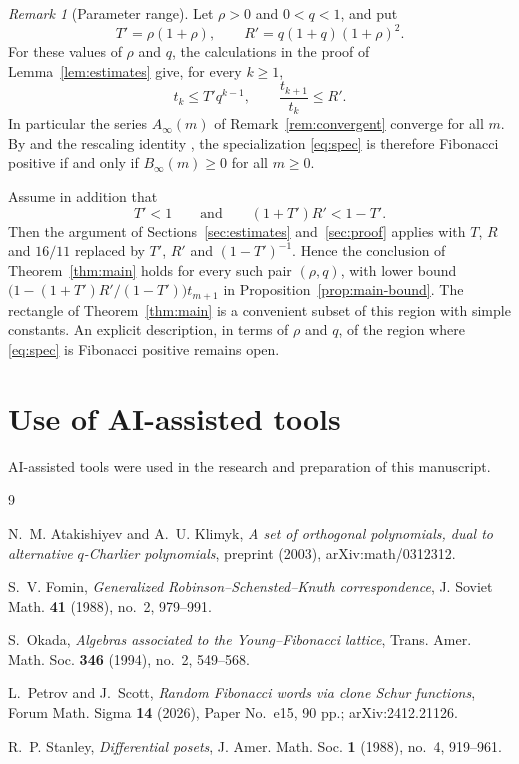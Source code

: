 \documentclass[11pt]{amsart}
\theoremstyle{definition}
\theoremstyle{remark}
\newtheorem{remark}[theorem]{Remark}
\numberwithin{equation}{section}
\begin{document}
\begin{remark}[Parameter range]\label{rem:range}
Let $\rho>0$ and $0<q<1$, and put
\[
T'=\rho(1+\rho),\qquad R'=q(1+q)(1+\rho)^2.
\]
For these values of $\rho$ and $q$, the calculations in the proof of Lemma~\ref{lem:estimates} give, for every $k\ge1$,
\[
t_k\le T'q^{k-1},\qquad \frac{t_{k+1}}{t_k}\le R'.
\]
In particular the series $A_\infty(m)$ of Remark~\ref{rem:convergent} converge for all $m$. By \cite[Proposition~4.7]{PS26} and the rescaling identity \cite[(2.13)]{PS26}, the specialization \eqref{eq:spec} is therefore Fibonacci positive if and only if $B_\infty(m)\ge0$ for all $m\ge0$.

Assume in addition that
\[
T'<1\qquad\text{and}\qquad (1+T')R'<1-T'.
\]
Then the argument of Sections~\ref{sec:estimates} and~\ref{sec:proof} applies with $T$, $R$ and $16/11$ replaced by $T'$, $R'$ and $(1-T')^{-1}$. Hence the conclusion of Theorem~\ref{thm:main} holds for every such pair $(\rho,q)$, with lower bound $\bigl(1-(1+T')R'/(1-T')\bigr)t_{m+1}$ in Proposition~\ref{prop:main-bound}. The rectangle of Theorem~\ref{thm:main} is a convenient subset of this region with simple constants. An explicit description, in terms of $\rho$ and $q$, of the region where \eqref{eq:spec} is Fibonacci positive remains open.
\end{remark}

\section*{Use of AI-assisted tools}

AI-assisted tools were used in the research and preparation of this manuscript.

\begin{thebibliography}{9}

N.~M. Atakishiyev and A.~U. Klimyk,
\emph{A set of orthogonal polynomials, dual to alternative $q$-Charlier polynomials},
preprint (2003), arXiv:math/0312312.

S.~V. Fomin,
\emph{Generalized Robinson--Schensted--Knuth correspondence},
J. Soviet Math. \textbf{41} (1988), no.~2, 979--991.

S.~Okada,
\emph{Algebras associated to the Young--Fibonacci lattice},
Trans. Amer. Math. Soc. \textbf{346} (1994), no.~2, 549--568.

L.~Petrov and J.~Scott,
\emph{Random Fibonacci words via clone Schur functions},
Forum Math. Sigma \textbf{14} (2026), Paper No.~e15, 90 pp.;
arXiv:2412.21126.

R.~P. Stanley,
\emph{Differential posets},
J. Amer. Math. Soc. \textbf{1} (1988), no.~4, 919--961.

\end{thebibliography}
\end{document}
